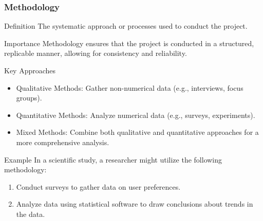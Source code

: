 \documentclass[aspectratio=169]{beamer}
\begin{document}
\begin{frame}[fragile]
    \frametitle{Methodology}
    \begin{block}{Definition}
        The systematic approach or processes used to conduct the project.
    \end{block}
    \begin{block}{Importance}
        Methodology ensures that the project is conducted in a structured, replicable manner, allowing for consistency and reliability.
    \end{block}
    \begin{block}{Key Approaches}
        \begin{itemize}
            \item Qualitative Methods: Gather non-numerical data (e.g., interviews, focus groups).
            \item Quantitative Methods: Analyze numerical data (e.g., surveys, experiments).
            \item Mixed Methods: Combine both qualitative and quantitative approaches for a more comprehensive analysis.
        \end{itemize}
    \end{block}
    \begin{block}{Example}
        In a scientific study, a researcher might utilize the following methodology:
        \begin{enumerate}
            \item Conduct surveys to gather data on user preferences.
            \item Analyze data using statistical software to draw conclusions about trends in the data.
        \end{enumerate}
    \end{block}
\end{frame}
\end{document}
